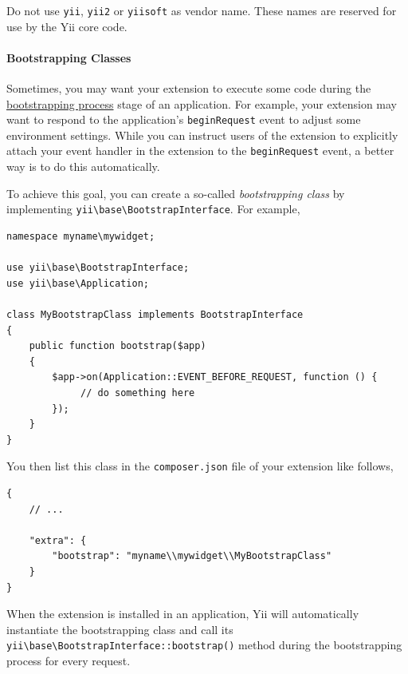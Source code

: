 Do not use \lstinline|yii|, \lstinline|yii2| or \lstinline|yiisoft| as vendor name. These names are reserved for use by the Yii core code.

\paragraph{Bootstrapping Classes \label{structure-extensions.md::bootstrapping-classes}}
Sometimes, you may want your extension to execute some code during the \hyperref[runtime-bootstrapping.md]{bootstrapping process}
stage of an application. For example, your extension may want to respond to the application's \lstinline|beginRequest| event
to adjust some environment settings. While you can instruct users of the extension to explicitly attach your event
handler in the extension to the \lstinline|beginRequest| event, a better way is to do this automatically.

To achieve this goal, you can create a so-called \textit{bootstrapping class} by implementing \texttt{yii{\allowbreak{}\textbackslash}base{\allowbreak{}\textbackslash}BootstrapInterface}.
For example,

\lstset{language=php}\begin{lstlisting}
namespace myname\mywidget;

use yii\base\BootstrapInterface;
use yii\base\Application;

class MyBootstrapClass implements BootstrapInterface
{
    public function bootstrap($app)
    {
        $app->on(Application::EVENT_BEFORE_REQUEST, function () {
             // do something here
        });
    }
}
\end{lstlisting}
You then list this class in the \lstinline|composer.json| file of your extension like follows,

\lstset{language=json}\begin{lstlisting}
{
    // ...

    "extra": {
        "bootstrap": "myname\\mywidget\\MyBootstrapClass"
    }
}
\end{lstlisting}
When the extension is installed in an application, Yii will automatically instantiate the bootstrapping class
and call its \texttt{yii{\allowbreak{}\textbackslash}base{\allowbreak{}\textbackslash}BootstrapInterface\allowbreak{}::\allowbreak{}bootstrap()} method during the bootstrapping process for
every request.

